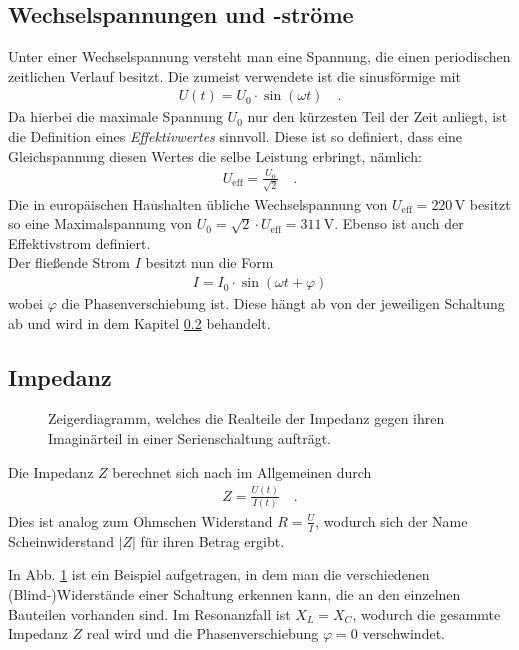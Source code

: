 \documentclass[12pt,a4paper,titlepage,headinclude,bibtotoc]{scrartcl}
\begin{document}
\subsection{Wechselspannungen und -ströme}
Unter einer Wechselspannung versteht man eine Spannung, die einen periodischen zeitlichen Verlauf besitzt.
Die zumeist verwendete ist die sinusförmige mit 
\begin{align*}
U(t)=U_0\cdot\sin(\omega t)\quad .
\end{align*}
Da hierbei die maximale Spannung $U_0$ nur den kürzesten Teil der Zeit anliegt, ist die Definition eines \emph{Effektivwertes} sinnvoll.
Diese ist so definiert, dass eine Gleichspannung diesen Wertes die selbe Leistung erbringt, nämlich:
\begin{align*}
U_\text{eff}=\frac{U_0}{\sqrt2}\quad .
\end{align*}
Die in europäischen Haushalten übliche Wechselspannung von $U_\text{eff}=220\,\si\volt$ besitzt so eine Maximalspannung von $U_0=\sqrt2\cdot U_\text{eff}=311\,\si\volt$.
Ebenso ist auch der Effektivstrom definiert.\\

Der fließende Strom $I$ besitzt nun die Form
\begin{align*}
I=I_0\cdot\sin(\omega t+\varphi)
\end{align*}
wobei $\varphi$ die Phasenverschiebung ist.
Diese hängt ab von der jeweiligen Schaltung ab und wird in dem Kapitel \ref{sec:impedanz} behandelt.

\subsection{Impedanz}
\label{sec:impedanz}
\begin{figure}[!h]
\centering

\caption{Zeigerdiagramm, welches die Realteile der Impedanz gegen ihren Imaginärteil in einer Serienschaltung aufträgt.}
\label{fig:zeiger}
\end{figure}
Die Impedanz $Z$ berechnet sich nach \cite[S. 236]{nolting3} im Allgemeinen durch
\begin{align*}
Z=\frac{U(t)}{I(t)}\quad .
\end{align*}
Dies ist analog zum Ohmschen Widerstand $R=\frac{U}{I}$, wodurch sich der Name Scheinwiderstand $|Z|$ für ihren Betrag ergibt.

In Abb. \ref{fig:zeiger} ist ein Beispiel aufgetragen, in dem man die verschiedenen (Blind-)Widerstände einer Schaltung erkennen kann, die an den einzelnen Bauteilen vorhanden sind.
Im Resonanzfall ist $X_L=X_C$, wodurch die gesammte Impedanz $Z$ real wird und die Phasenverschiebung $\varphi=0$ verschwindet.
\end{document}
